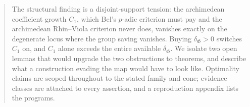 \documentclass[11pt,reqno]{amsart}
\theoremstyle{plain}
\theoremstyle{definition}
\numberwithin{equation}{section}
\newcommand{\Gp}{\mathfrak{G}}
\newcommand{\dgr}{\delta_{\Gp}}
\begin{document}
\begin{abstract}
The structural finding is a disjoint-support tension: the archimedean coefficient growth
$C_1$, which Bel's $p$-adic criterion must pay and the archimedean Rhin--Viola criterion
never does, vanishes exactly on the degenerate locus where the group saving vanishes. Buying
$\dgr>0$ switches $C_1$ on, and $C_1$ alone exceeds the entire available $\dgr$. We isolate
two open lemmas that would upgrade the two obstructions to theorems, and describe what a
construction evading the map would have to look like. Optimality claims are scoped
throughout to the stated family and cone; evidence classes are attached to every assertion,
and a reproduction appendix lists the programs.
\end{abstract}

\maketitle

\tableofcontents











\appendix



\end{document}
